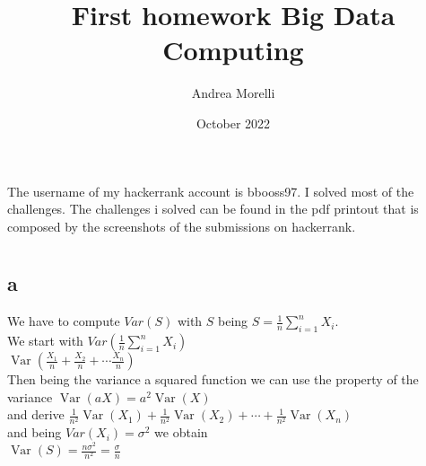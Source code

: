 \documentclass{article}
\title{First homework Big Data Computing}
\author{Andrea Morelli}
\date{October 2022}
\begin{document}
\maketitle

\section{}
The username of my hackerrank account is bbooss97.
I solved most of the challenges.
The challenges i solved can be found in the pdf printout that is composed by the screenshots of the submissions on hackerrank.

\section{}
\subsection{a}
We have to compute $Var(S)$ with $S$ being 
$S=\frac{1}{n} \sum_{i=1}^n X_i$.\\
We start with $Var(\frac{1}{n} \sum_{i=1}^n X_i)$\\
$
\operatorname{Var}\left(\frac{X_1}{n}+\frac{X_2}{n}+\cdots \frac{X_n}{n}\right)
$\\
Then being the variance a squared function we can use the property of the variance $\operatorname{Var}(a X)=a^2 \operatorname{Var}(X)$\\
and derive $\frac{1}{n^2} \operatorname{Var}\left(X_1\right)+\frac{1}{n^2} \operatorname{Var}\left(X_2\right)+\cdots+\frac{1}{n^2} \operatorname{Var}\left(X_n\right)$\\
and being $Var(X_i)=\sigma^2$ we obtain\\
$\operatorname{Var}(S)=\frac{n \sigma^2}{n^2}=\frac{\sigma}{n}$
\end{document}
